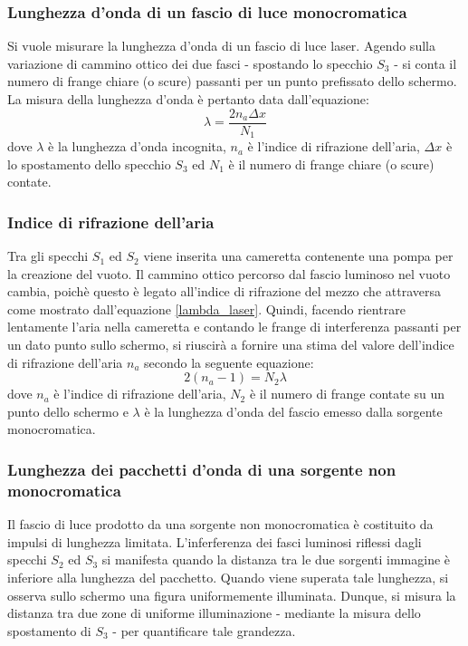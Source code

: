 \documentclass[]{article}
\begin{document}
\subsubsection{Lunghezza d'onda di un fascio di luce monocromatica}

Si vuole misurare la lunghezza d'onda di un fascio di luce laser. Agendo sulla variazione di cammino ottico dei due fasci - spostando lo specchio $S_3$ - si conta il numero di frange chiare (o scure) passanti per un punto prefissato dello schermo. La misura della lunghezza d'onda è pertanto data dall'equazione:
\begin{equation}
    \label{lambda_laser}
    \lambda = \frac{2 n_a \Delta x}{N_1}
\end{equation}
dove $\lambda$ è la lunghezza d'onda incognita, $n_a$ è l'indice di rifrazione dell'aria, $\Delta x$ è lo spostamento dello specchio $S_3$ ed $N_1$ è il numero di frange chiare (o scure) contate.

\subsubsection{Indice di rifrazione dell'aria}

Tra gli specchi $S_1$ ed $S_2$ viene inserita una cameretta contenente una pompa per la creazione del vuoto. Il cammino ottico percorso dal fascio luminoso nel vuoto cambia, poichè questo è legato all'indice di rifrazione del mezzo che attraversa come mostrato dall'equazione \ref{lambda_laser}. Quindi, facendo rientrare lentamente l'aria nella cameretta e contando le frange di interferenza passanti per un dato punto sullo schermo, si riuscirà a fornire una stima del valore dell'indice di rifrazione dell'aria $n_a$ secondo la seguente equazione:
\begin{equation}
    \label{n_a}
    2(n_a - 1) = N_2 \lambda
\end{equation}
dove $n_a$ è l'indice di rifrazione dell'aria, $N_2$ è il numero di frange contate su un punto dello schermo e $\lambda$ è la lunghezza d'onda del fascio emesso dalla sorgente monocromatica.

\subsubsection{Lunghezza dei pacchetti d'onda di una sorgente non monocromatica}
\label{par:123}

Il fascio di luce prodotto da una sorgente non monocromatica è costituito da impulsi di lunghezza limitata. L'inferferenza dei fasci luminosi riflessi dagli specchi $S_2$ ed $S_3$ si manifesta quando la distanza tra le due sorgenti immagine è inferiore alla lunghezza del pacchetto. Quando viene superata tale lunghezza, si osserva sullo schermo una figura uniformemente illuminata. Dunque, si misura la distanza tra due zone di uniforme illuminazione - mediante la misura dello spostamento di $S_3$ - per quantificare tale grandezza.
\end{document}
